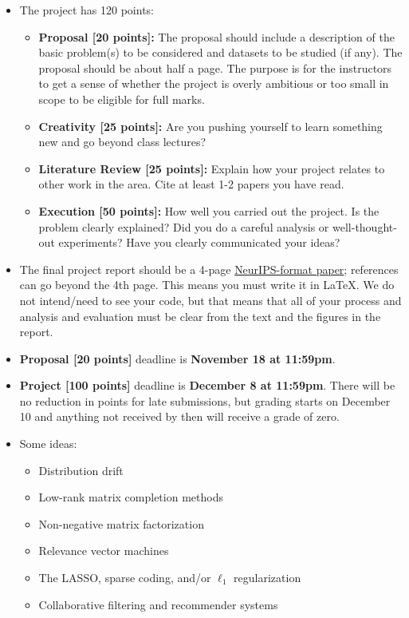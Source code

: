 \documentclass[11pt]{article}
\begin{document}
\begin{itemize}
\item The project has 120 points:
\begin{itemize}
\item {\bf Proposal [20 points]:}
The proposal should include a description of the basic problem(s) to be considered and datasets to be studied (if any).  The proposal should be about half a page. The purpose is for the instructors to get a sense of whether the project is overly ambitious or too small in scope to be eligible for full marks.
\item {\bf Creativity [25 points]:}
Are you pushing yourself to learn something new and go beyond class lectures?
\item {\bf Literature Review [25 points]:}
Explain how your project relates to other work in the area.  Cite at least 1-2 papers you have read.
\item {\bf Execution [50 points]:}
How well you carried out the project.
Is the problem clearly explained?
Did you do a careful analysis or well-thought-out experiments?
Have you clearly communicated your ideas?
\end{itemize}
\item The final project report should be a 4-page \href{https://www.overleaf.com/latex/templates/neurips-2024/tpsbbrdqcmsh}{NeurIPS-format paper}; references can go beyond the 4th page.  This means you must write it in LaTeX. We do not intend/need to see your code, but that means that all of your process and analysis and evaluation must be clear from the text and the figures in the report.
  \item {\bf Proposal [20 points]} deadline is {\bf November 18 at 11:59pm}.
  \item {\bf Project [100 points]} deadline is {\bf December 8 at 11:59pm}.  There will be no reduction in points for late submissions, but grading starts on December 10 and anything not received by then will receive a grade of zero.
\item Some ideas:
\begin{itemize}
  \item Distribution drift
  \item Low-rank matrix completion methods
  \item Non-negative matrix factorization
  \item Relevance vector machines
  \item The LASSO, sparse coding, and/or $\ell_1$ regularization
  \item Collaborative filtering and recommender systems

\end{itemize}
\end{itemize}
\end{document}
